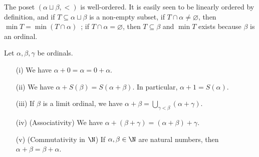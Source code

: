 \begin{remark}
    The poset $(\alpha \sqcup \beta, <)$ is well-ordered. It is easily seen to be linearly ordered by definition, and if $T \subseteq \alpha \sqcup \beta$ is a non-empty subset, if $T \cap \alpha \neq \varnothing$, then $\min T = \min(T \cap \alpha)$~; if $T \cap \alpha = \varnothing$, then $T \subseteq \beta$ and $\min T$ exists because $\beta$ is an ordinal.
\end{remark}

\begin{proposition} \label{properties-of-ordinal-addition}
    Let $\alpha,\beta, \gamma$ be ordinals.
    \\

    \begin{itemize}
        \item[(i)] We have $\alpha + 0 = \alpha = 0 + \alpha$.
        \\

        \item[(ii)] We have $\alpha + S(\beta) = S(\alpha + \beta)$. In particular, $\alpha + 1 = S(\alpha)$.
        \\

        \item[(iii)] If $\beta$ is a limit ordinal, we have $\alpha + \beta = \bigcup_{\gamma < \beta} (\alpha + \gamma)$.
        \\

        \item[(iv)] (Associativity) We have $\alpha + (\beta + \gamma) = (\alpha + \beta) + \gamma$. 
        \\

        \item[(v)] (Commutativity in $\N$) If $\alpha, \beta \in \N$ are natural numbers, then $\alpha + \beta = \beta + \alpha$.
        \\

    \end{itemize}
\end{proposition}

